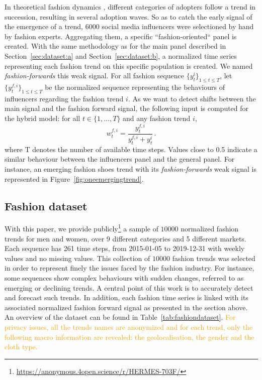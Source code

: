 \documentclass[10pt]{article} %
\newcommand{\ts}{y}
\newcommand{\ws}{w}
\newcommand{\numberts}{10000}
\begin{document}
In theoretical fashion dynamics \citep{rogers1962}, different categories of adopters follow a trend in succession, resulting in several adoption waves.
So as to catch the early signal of the emergence of a trend, 6000 social media influencers were selectioned by hand by fashion experts. Aggregating them, a specific ``fashion-oriented`` panel is created. With the same methodology as for the main panel described in Section~\ref{sec:dataset:a} and Section~\ref{sec:dataset:b}, a normalized time series representing each fashion trend on this specific population is created. We named \textit{fashion-forwards} this weak signal.  For all fashion sequence $\{y^i_t\}_{1 \leq t \leq T}$, let $\{\ts^{f,i}_t\}_{1 \leq t \leq T}$ be the normalized sequence representing the behaviours of influencers regarding the fashion trend $i$. As we want to detect shifts between the main signal and the fashion forward signal, the following input is computed for the hybrid model: for all $t \in \{1,\ldots,T\}$ and any fashion trend $i$,
$$
\ws^{f,i}_{t} = \frac{\ts_t^{f,i}}{\ts_t^{f,i}+\ts_t^{i}}\,.
$$
where T denotes the number of available time steps. Values close to 0.5 indicate a similar behaviour between the influencers panel and the general panel. For instance, an  emerging fashion shoes trend with its \textit{fashion-forwards} weak signal is represented in Figure~\ref{fig:oneemergingtrend}. 

\subsection{Fashion dataset}

With this paper, we provide publicly\footnote[1]{\url{https://anonymous.4open.science/r/HERMES-703F/}} a sample of $\numberts$ normalized fashion trends for men and women, over 9 different categories and 5 different markets. Each sequence has 261 time steps, from 2015-01-05 to 2019-12-31 with weekly values and no missing values. This collection of $\numberts$ fashion trends was selected in order to represent finely the issues faced by the fashion industry. For instance, some sequences show complex behaviours with sudden changes, referred to as emerging or declining trends. A central point of this work is to accurately detect and forecast such trends. In addition, each fashion time series is linked with its associated normalized fashion forward signal as presented in the section above. An overview of the dataset can be found in Table~\ref{tab:fashiondataset}. \textcolor{orange}{For privacy issues, all the trends names are anonymized and for each trend, only the following macro information are revealed: the geolocalisation, the gender and the cloth type.}
\end{document}
